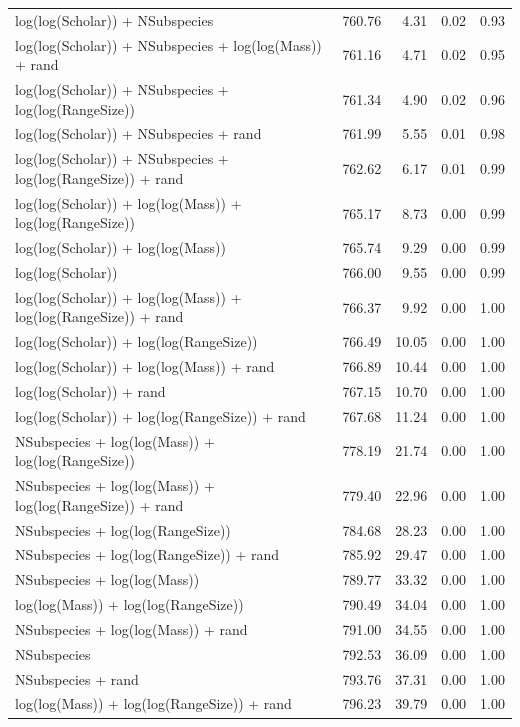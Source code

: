 \begin{table}[ht]
\begin{tabular}{@{}lrrrr@{}}
  log(log(Scholar)) + NSubspecies & 760.76 & 4.31 & 0.02 & 0.93 \\ 
  log(log(Scholar)) + NSubspecies + log(log(Mass)) + rand & 761.16 & 4.71 & 0.02 & 0.95 \\ 
  log(log(Scholar)) + NSubspecies + log(log(RangeSize)) & 761.34 & 4.90 & 0.02 & 0.96 \\ 
  log(log(Scholar)) + NSubspecies + rand & 761.99 & 5.55 & 0.01 & 0.98 \\ 
  log(log(Scholar)) + NSubspecies + log(log(RangeSize)) + rand & 762.62 & 6.17 & 0.01 & 0.99 \\ 
  log(log(Scholar)) + log(log(Mass)) + log(log(RangeSize)) & 765.17 & 8.73 & 0.00 & 0.99 \\ 
  log(log(Scholar)) + log(log(Mass)) & 765.74 & 9.29 & 0.00 & 0.99 \\ 
  log(log(Scholar)) & 766.00 & 9.55 & 0.00 & 0.99 \\ 
  log(log(Scholar)) + log(log(Mass)) + log(log(RangeSize)) + rand & 766.37 & 9.92 & 0.00 & 1.00 \\ 
  log(log(Scholar)) + log(log(RangeSize)) & 766.49 & 10.05 & 0.00 & 1.00 \\ 
  log(log(Scholar)) + log(log(Mass)) + rand & 766.89 & 10.44 & 0.00 & 1.00 \\ 
  log(log(Scholar)) + rand & 767.15 & 10.70 & 0.00 & 1.00 \\ 
  log(log(Scholar)) + log(log(RangeSize)) + rand & 767.68 & 11.24 & 0.00 & 1.00 \\ 
  NSubspecies + log(log(Mass)) + log(log(RangeSize)) & 778.19 & 21.74 & 0.00 & 1.00 \\ 
  NSubspecies + log(log(Mass)) + log(log(RangeSize)) + rand & 779.40 & 22.96 & 0.00 & 1.00 \\ 
  NSubspecies + log(log(RangeSize)) & 784.68 & 28.23 & 0.00 & 1.00 \\ 
  NSubspecies + log(log(RangeSize)) + rand & 785.92 & 29.47 & 0.00 & 1.00 \\ 
  NSubspecies + log(log(Mass)) & 789.77 & 33.32 & 0.00 & 1.00 \\ 
  log(log(Mass)) + log(log(RangeSize)) & 790.49 & 34.04 & 0.00 & 1.00 \\ 
  NSubspecies + log(log(Mass)) + rand & 791.00 & 34.55 & 0.00 & 1.00 \\ 
  NSubspecies & 792.53 & 36.09 & 0.00 & 1.00 \\ 
  NSubspecies + rand & 793.76 & 37.31 & 0.00 & 1.00 \\ 
  log(log(Mass)) + log(log(RangeSize)) + rand & 796.23 & 39.79 & 0.00 & 1.00 \\ 

\end{tabular}
\end{table}
